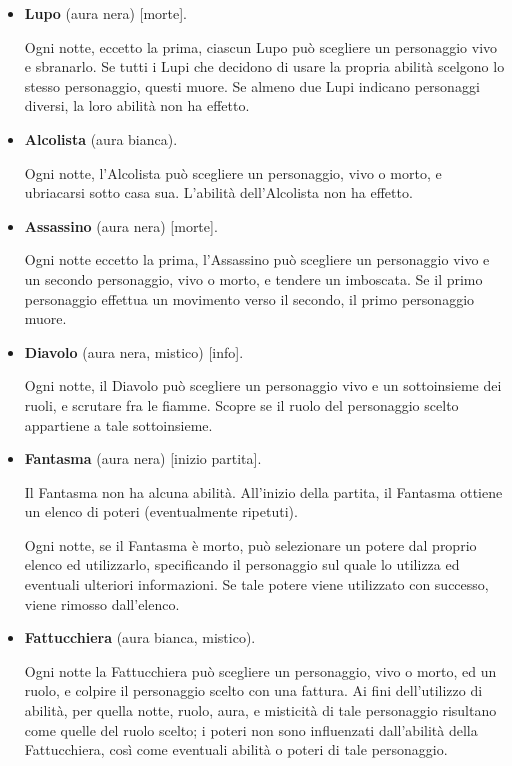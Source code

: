 \documentclass[a4paper,10pt]{article}
\begin{document}
\begin{itemize}

    \item {\bf Lupo} (aura nera) [morte].

          Ogni notte, eccetto la prima, ciascun Lupo può scegliere un personaggio vivo e sbranarlo. Se tutti i Lupi che decidono di usare la propria abilità scelgono lo stesso personaggio, questi muore. Se almeno due Lupi indicano personaggi diversi, la loro abilità non ha effetto.

    \item {\bf Alcolista} (aura bianca).

          Ogni notte, l'Alcolista può scegliere un personaggio, vivo o morto, e ubriacarsi sotto casa sua. L'abilità dell'Alcolista non ha effetto.

    \item {\bf Assassino} (aura nera) [morte].

          Ogni notte eccetto la prima, l'Assassino può scegliere un personaggio vivo e un secondo personaggio, vivo o morto, e tendere un imboscata. Se il primo personaggio effettua un movimento verso il secondo, il primo personaggio muore.

    \item {\bf Diavolo} (aura nera, mistico) [info].

          Ogni notte, il Diavolo può scegliere un personaggio vivo e un sottoinsieme dei ruoli, e scrutare fra le fiamme. Scopre se il ruolo del personaggio scelto appartiene a tale sottoinsieme.

    \item {\bf Fantasma} (aura nera) [inizio partita].

          Il Fantasma non ha alcuna abilità. All'inizio della partita, il Fantasma ottiene un elenco di poteri (eventualmente ripetuti).

          Ogni notte, se il Fantasma è morto, può selezionare un potere dal proprio elenco ed utilizzarlo, specificando il personaggio sul quale lo utilizza ed eventuali ulteriori informazioni. Se tale potere viene utilizzato con successo, viene rimosso dall'elenco.

    \item {\bf Fattucchiera} (aura bianca, mistico).

          Ogni notte la Fattucchiera può scegliere un personaggio, vivo o morto, ed un ruolo, e colpire il personaggio scelto con una fattura. Ai fini dell'utilizzo di abilità, per quella notte, ruolo, aura, e misticità di tale personaggio risultano come quelle del ruolo scelto; i poteri non sono influenzati dall'abilità della Fattucchiera, così come eventuali abilità o poteri di tale personaggio.


\end{itemize}
\end{document}
